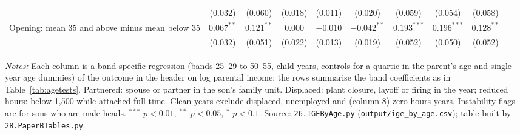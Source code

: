 \begin{table}[!htbp]
{{\begin{tabular}{lcccccccc}
 & (0.032) & (0.060) & (0.018) & (0.011) & (0.020) & (0.059) & (0.054) & (0.058) \\
Opening: mean 35 and above minus mean below 35 & $0.067^{**}$ & $0.121^{**}$ & $0.000$ & $-0.010$ & $-0.042^{**}$ & $0.193^{***}$ & $0.196^{***}$ & $0.128^{**}$ \\
 & (0.032) & (0.051) & (0.022) & (0.013) & (0.019) & (0.052) & (0.050) & (0.052) \\
\bottomrule
\end{tabular}}}
\par\smallskip
\begin{minipage}{\textwidth}\footnotesize \textit{Notes:} Each column is a band-specific regression (bands 25--29 to 50--55, child-years, controls for a quartic in the parent's age and single-year age dummies) of the outcome in the header on log parental income; the rows summarise the band coefficients as in Table~\ref{tab:agetests}. Partnered: spouse or partner in the son's family unit. Displaced: plant closure, layoff or firing in the year; reduced hours: below 1,500 while attached full time. Clean years exclude displaced, unemployed and (column 8) zero-hours years. Instability flags are for sons who are male heads. $^{***}$ $p<0.01$, $^{**}$ $p<0.05$, $^{*}$ $p<0.1$. Source: \texttt{26.IGEByAge.py} (\texttt{output/ige\_by\_age.csv}); table built by \texttt{28.PaperBTables.py}.\end{minipage}
\end{table}
